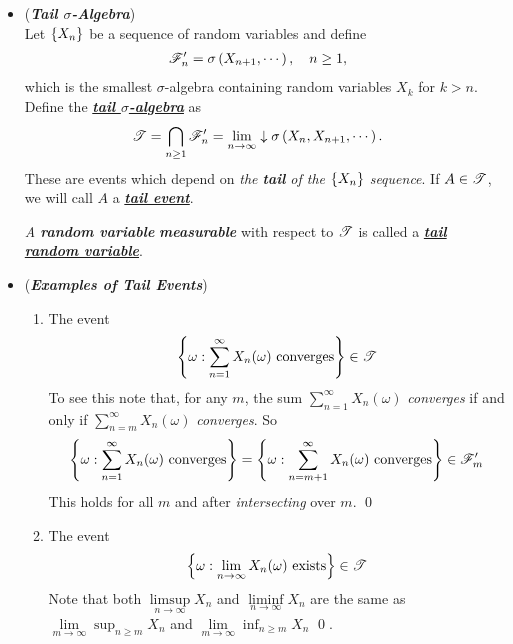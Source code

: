 \documentclass[11pt]{article}
\begin{document}
\begin{itemize}
\item \begin{definition} (\emph{\textbf{Tail $\sigma$-Algebra}})\\
Let $\left\{X_{n}\right\}$ be a sequence of random variables and define 
\begin{align*}
{\mathscr F}_{n}' &= \sigma\left(X_{n+1}, \cdots\right), \quad n\ge 1,
\end{align*} which is the smallest $\sigma$-algebra containing random variables $X_k$ for $k > n$.
Define the \underline{\emph{\textbf{tail $\sigma$-algebra}}} as 
\begin{align*}
{\mathscr T} &= \bigcap_{n\ge 1}{\mathscr F}_{n}' = \lim\limits_{n\rightarrow \infty} \downarrow \sigma\left(X_n, X_{n+1}, \cdots\right).
\end{align*}
These are events which depend on \emph{the \textbf{tail} of the $\left\{X_{n}\right\}$ sequence}. If  $A\in {\mathscr T}$, we
will call $A$ a \underline{\emph{\textbf{tail event}}}. 

\emph{A \textbf{random variable}} \emph{\textbf{measurable}} with respect to ${\mathscr T}$ is called a \underline{\emph{\textbf{tail random variable}}}.
\end{definition}


\item \begin{example} (\emph{\textbf{Examples of Tail Events}})
\begin{enumerate}
\item The event 
\begin{align*}
\left\{\omega: \sum_{n=1}^{\infty}X_{n}(\omega) \text{ converges}\right\} \in {\mathscr T}
\end{align*}
To see this note that, for any $m$, the sum $\sum_{n=1}^{\infty}X_{n}(\omega)$ \emph{converges} if and only if $\sum_{n=m}^{\infty}X_{n}(\omega)$ \emph{converges}. So
\begin{align*}
\left\{\omega: \sum_{n=1}^{\infty}X_{n}(\omega) \text{ converges}\right\} = \left\{\omega: \sum_{n=m+1}^{\infty}X_{n}(\omega) \text{ converges}\right\} \in {\mathscr F}_{m}'
\end{align*}
This holds for all $m$ and after \emph{intersecting} over $m$. \qed

\item The event 
\begin{align*}
\left\{\omega: \lim\limits_{n\rightarrow \infty}X_{n}(\omega) \text{ exists}\right\} \in {\mathscr T}
\end{align*} Note that both $\limsup\limits_{n\rightarrow \infty} X_{n}$ and $\liminf\limits_{n\rightarrow \infty} X_{n}$ are the same as 
$\lim\limits_{m\rightarrow \infty}\sup_{n \ge m} X_{n}$ and $\lim\limits_{m \rightarrow \infty}\inf_{n \ge m} X_{n}$ \qed.



\end{enumerate}
\end{example}
\end{itemize}
\end{document}
